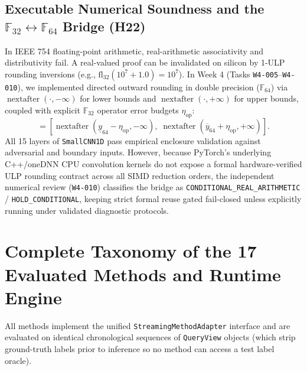 \documentclass[11pt,a4paper]{article}
\newcommand{\F}{\mathbb{F}}
\newcommand{\code}[1]{{\small\ttfamily\nolinkurl{#1}}}
\theoremstyle{remark}
\begin{document}
\subsection{\texorpdfstring{Executable Numerical Soundness and the $\F_{32} \leftrightarrow \F_{64}$ Bridge (H22)}{Executable Numerical Soundness and the F32-F64 Bridge (H22)}}
In IEEE 754 floating-point arithmetic, real-arithmetic associativity and distributivity fail. A real-valued proof can be invalidated on silicon by 1-ULP rounding inversions (e.g., $\text{fl}_{32}(10^7 + 1.0) = 10^7$). In Week 4 (Tasks \code{W4-005}--\code{W4-010}), we implemented directed outward rounding in double precision ($\F_{64}$) via $\operatorname{nextafter}(\cdot, -\infty)$ for lower bounds and $\operatorname{nextafter}(\cdot, +\infty)$ for upper bounds, coupled with explicit $\F_{32}$ operator error budgets $\eta_{\text{op}}$:
\begin{equation}
  [\underline{y}_{\text{safe}}, \overline{y}_{\text{safe}}] = \left[ \operatorname{nextafter}(\underline{y}_{64} - \eta_{\text{op}}, -\infty), \; \operatorname{nextafter}(\overline{y}_{64} + \eta_{\text{op}}, +\infty) \right].
\end{equation}
All 15 layers of \code{SmallCNN1D} pass empirical enclosure validation against adversarial and boundary inputs. However, because PyTorch's underlying C++/oneDNN CPU convolution kernels do not expose a formal hardware-verified ULP rounding contract across all SIMD reduction orders, the independent numerical review (\code{W4-010}) classifies the bridge as \code{CONDITIONAL\_REAL\_ARITHMETIC} / \code{HOLD\_CONDITIONAL}, keeping strict formal reuse gated fail-closed unless explicitly running under validated diagnostic protocols.

\section{Complete Taxonomy of the 17 Evaluated Methods and Runtime Engine}

All methods implement the unified \code{StreamingMethodAdapter} interface and are evaluated on identical chronological sequences of \code{QueryView} objects (which strip ground-truth labels prior to inference so no method can access a test label oracle).
\end{document}
